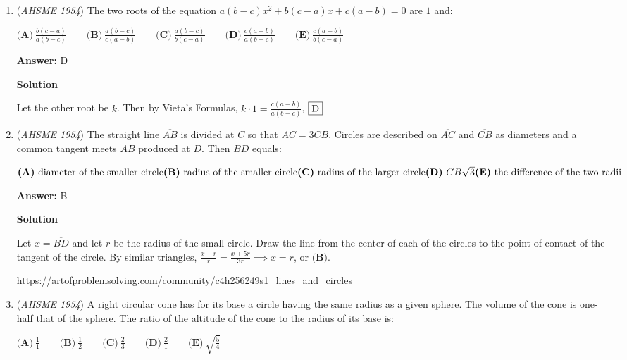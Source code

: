 \begin{enumerate}
	\item (\textit{AHSME 1954}) The two roots of the equation $a(b-c)x^2+b(c-a)x+c(a-b)=0$ are $1$ and: 


 $\textbf{(A)}\ \frac{b(c-a)}{a(b-c)}\qquad\textbf{(B)}\ \frac{a(b-c)}{c(a-b)}\qquad\textbf{(C)}\ \frac{a(b-c)}{b(c-a)}\qquad\textbf{(D)}\ \frac{c(a-b)}{a(b-c)}\qquad\textbf{(E)}\ \frac{c(a-b)}{b(c-a)}$

 \textbf{Answer: }D



\textbf{Solution}

Let the other root be $k$. Then by Vieta's Formulas, $k\cdot 1=\frac{c(a-b)}{a(b-c)}$, $\fbox{D}$



	\item (\textit{AHSME 1954}) The straight line $\overline{AB}$ is divided at $C$ so that $AC=3CB$. Circles are described on $\overline{AC}$ 
and $\overline{CB}$ as diameters and a common tangent meets $AB$ produced at $D$. Then $BD$ equals: 


 $\textbf{(A)}\ \text{diameter of the smaller circle}\\ \textbf{(B)}\ \text{radius of the smaller circle}\\ \textbf{(C)}\ \text{radius of the larger circle}\\ \textbf{(D)}\ CB\sqrt{3}\\ \textbf{(E)}\ \text{the difference of the two radii}$

 \textbf{Answer: }B



\textbf{Solution}

Let $x=\overline{BD}$ and let $r$ be the radius of the small circle. Draw the line from the center of each of the circles to the point of contact of the tangent of the circle. By similar triangles, $\frac{x+r}{r}=\frac{x+5r}{3r} \implies x=r$, or $\boxed{\textbf{(B)}}$.

 \href{https://artofproblemsolving.com/community/c4h256249s1\_lines\_and\_circles}{https://artofproblemsolving.com/community/c4h256249s1\_lines\_and\_circles}

 


	\item (\textit{AHSME 1954}) A right circular cone has for its base a circle having the same radius as a given sphere. 
The volume of the cone is one-half that of the sphere. The ratio of the altitude of the cone to the radius of its base is:


 $\textbf{(A)}\ \frac{1}{1}\qquad\textbf{(B)}\ \frac{1}{2}\qquad\textbf{(C)}\ \frac{2}{3}\qquad\textbf{(D)}\ \frac{2}{1}\qquad\textbf{(E)}\ \sqrt{\frac{5}{4}}$


\end{enumerate}
